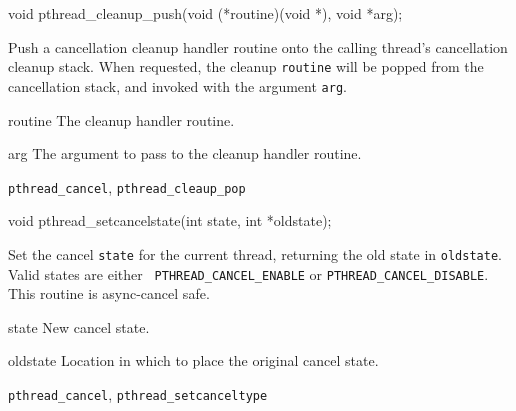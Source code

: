 \begin{apisyn}

	\funcproto void pthread_cleanup_push(void (*routine)(void *),
                                            void *arg);
\end{apisyn}
\begin{apidesc}
	Push a cancellation cleanup handler routine onto the calling
	thread's cancellation cleanup stack. When requested, the cleanup
	{\tt routine} will be popped from the cancellation stack, and
	invoked with the argument {\tt arg}.
\end{apidesc}
\begin{apiparm}
	\item[routine]
		The cleanup handler routine.
	\item[arg]
		The argument to pass to the cleanup handler routine.
\end{apiparm}
\begin{apirel}
	{\tt pthread_cancel}, {\tt pthread_cleaup_pop} 
\end{apirel}


\begin{apisyn}

	\funcproto void pthread_setcancelstate(int state, int *oldstate);
\end{apisyn}
\begin{apidesc}
	Set the cancel {\tt state} for the current thread, returning the
	old state in {\tt oldstate}. Valid states are either {\tt
	PTHREAD_CANCEL_ENABLE} or {\tt PTHREAD_CANCEL_DISABLE}. This
	routine is async-cancel safe.
\end{apidesc}
\begin{apiparm}
	\item[state]
		New cancel state.
	\item[oldstate]
		Location in which to place the original cancel state.
\end{apiparm}
\begin{apirel}
	{\tt pthread_cancel}, {\tt pthread_setcanceltype} 
\end{apirel}


